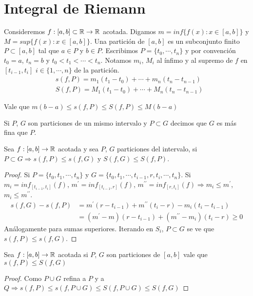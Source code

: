 \section{Integral de Riemann}

Consideremos \(f: [a, b] \subset \mathbb{R} \to \mathbb{R}\) acotada. Digamos \(m = inf\{ f(x) : x \in [a,b] \}\) y \(M = sup \{ f(x) : x \in [a, b] \}\).
Una partición de \([a, b]\) es un subconjunto finito \(P \subset [a, b]\) tal que \(a \in P\) y \(b \in P\).
Escribimos \(P = \{ t_0, \cdots, t_n \}\) y por convención \(t_0 = a\), \(t_n = b\) y \(t_0 < t_1 < \cdots < t_n\).
Notamos \(m_i\), \(M_i\) al ínfimo y al supremo de \(f\) en \([t_{i-1}, t_i]\) \(i \in \{ 1, \cdots, n \}\) de la partición.
\begin{align*}
   & s(f, P) = m_1 (t_1 - t_0) + \cdots + m_n (t_n - t_{n-1}) \\
   & S(f, P) = M_1 (t_1 - t_0) + \cdots + M_n (t_n - t_{n-1})
\end{align*}

Vale que \(m (b-a) \leq s(f, P) \leq S(f, P) \leq M (b-a)\)

\begin{definition}
  Si \(P\), \(G\) son particiones de un mismo intervalo y \(P \subset G\) decimos que \(G\) es más fina que \(P\).
\end{definition}

\begin{lemma}
  Sea \(f: [a, b] \to \mathbb{R}\) acotada y sea \(P\), \(G\) particiones del intervalo, si \(P \subset G \Rightarrow s(f, P) \leq s(f, G)\) y \(S(f, G) \leq S(f, P)\).
  \begin{proof}
    Si \(P = \{ t_0, t_1, \cdots, t_n \}\) y \(G = \{ t_0, t_1, \cdots, t_{i-1}, r, t_i, \cdots, t_n \}\). Si \(m_i = inf_{[t_{i-1}, t_i]}(f)\), \(m^{\prime} = inf_{[t_{i-1}, r]}(f)\), \(m^{\prime \prime} = inf_{[r, t_i]}(f) \Rightarrow m_i \leq m^{\prime}\), \(m_i \leq m^{\prime \prime}\). \begin{align*}
      s(f, G) - s(f, P) & = m^{\prime} (r - t_{i-1}) + m^{\prime \prime} (t_i - r) - m_i (t_i - t_{i-1}) \\
                        & = (m^{\prime} - m)(r - t_{i-1}) + (m^{\prime \prime} - m_i) (t_i - r) \geq 0
    \end{align*}
    Análogamente para sumas superiores. Iterando en \(S_i\), \(P \subset G\) se ve que \(s(f, P) \leq s(f, G)\).
  \end{proof}
\end{lemma}

\begin{corollary}
  Sea \(f: [a, b] \to \mathbb{R}\) acotada si \(P\), \(G\) son particiones de \([a, b]\) vale que \(s(f, P) \leq S(f, G)\)
  \begin{proof}
    Como \(P \cup G\) refina a \(P\) y a \(Q \Rightarrow s(f, P) \leq s(f, P \cup G) \leq S(f, P \cup G) \leq S(f, G)\)
  \end{proof}
\end{corollary}

